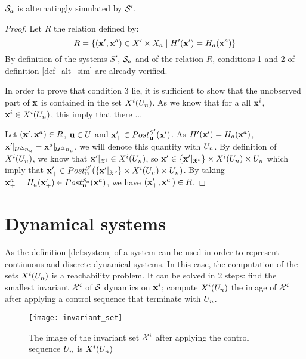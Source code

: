 \begin{prop}
$\mathcal{S}_a$ is alternatingly simulated by $\mathcal{S}'$.
\end{prop}

\begin{proof}
Let $R$ the relation defined by:
\begin{equation}
R = \{ ( \mathbf{x}', \mathbf{x}^a) \in X' \times X_a \mid H'( \mathbf{x}') = H_a( \mathbf{x}^a) \}
\end{equation}
By definition of the systems $S'$, $\mathcal{S}_a$ and of the relation $R$, conditions 1 and 2 of definition \ref{def_alt_sim} are already verified.

In order to prove that condition 3 lie, it is sufficient to show that the unobserved part of $ \mathbf{x}$ is contained in the set $X^i(U_n)$.
As we know that for a all $ \mathbf{x}^i$,$  \mathbf{x}^i \in X^i(U_n)$, this imply that there ...

Let $( \mathbf{x}', \mathbf{x}^a) \in R$, $ \mathbf{u} \in U$ and $ \mathbf{x}'_+ \in Post_{ \mathbf{u}}^{S'}( \mathbf{x}')$.
As $H'( \mathbf{x}') = H_a( \mathbf{x}^a)$, $ \mathbf{x}' |_{\mathcal{U}^\Delta n_u} =  \mathbf{x}^a |_{\mathcal{U}^\Delta n_u}$, we will denote this quantity with $U_n$.
By definition of $X^i(U_n)$,
we know that $ \mathbf{x}' |_{\mathfrak{X}^i} \in X^i(U_n)$,
so
$ \mathbf{x}' \in \{ \mathbf{x}' |_{\mathfrak{X}^o} \} \times X^i(U_n) \times U_n$
which imply that
$ \mathbf{x}'_+ \in Post_{ \mathbf{u}}^{S'}(\{ \mathbf{x}' |_{\mathfrak{X}^o} \} \times X^i(U_n) \times U_n )$.
By taking $ \mathbf{x}^a_+ = H_a( \mathbf{x}'_+) \in Post_{ \mathbf{u}}^{S_a}( \mathbf{x}^a)$,
we have $( \mathbf{x}'_+, \mathbf{x}^a_+) \in R$.
\end{proof}

\section{Dynamical systems}

As the definition \ref{def:system} of a system can be used in order to represent continuous and discrete dynamical systems.
In this case, the computation of the sets $X^i(U_n)$ is a reachability problem.
It can be solved in 2 steps: find the smallest invariant ${\mathcal{X}^i}$ of $\mathcal{S}$ dynamics on $ \mathbf{x}^i$; compute $X^i(U_n)$ the image of ${\mathcal{X}^i}$ after applying a control sequence that terminate with $U_n$.

\begin{figure}
\centering
\texttt{[image: invariant\_set]}
\caption{The image of the invariant set ${\mathcal{X}^i}$ after applying the control sequence $U_n$ is $X^i(U_n)$}
\end{figure}

